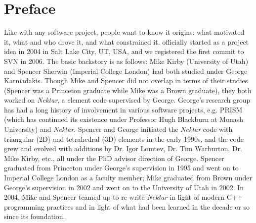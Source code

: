 \chapter{Preface}
 
Like with any software project, people want to know it origins:  what motivated it, what and who drove it, and what
constrained it.  \nek{} officially started as a project idea in 2004 in Salt Lake City, UT, USA, and we registered
the first commit to SVN in 2006.  The basic backstory is as follows:  Mike Kirby (University of Utah) and Spencer
Sherwin (Imperial College London) had both studied under George Karniadakis.  Though Mike and Spencer did
not overlap in terms of their studies (Spencer was a Princeton graduate while Mike was a Brown graduate), they
both worked on \emph{Nektar}, a \shp{} element code supervised by George.  George's research group has
had a long history of involvement in various software projects, e.g. PRISM (which has continued its existence
under Professor Hugh Blackburn at Monash University) and \emph{Nektar}.  
Spencer and George initiated the \emph{Nektar} code with triangular (2D) and
tetrahedral (3D) \shp{} elements in the early 1990s, and the code grew and evolved with additions
by Dr. Igor Lomtev,  Dr. Tim Warburton, Dr. Mike Kirby, etc., all under the PhD advisor direction of George.  Spencer
graduated from Princeton under George's supervision in 1995 and went on to Imperial College London 
as a faculty member; Mike graduated from Brown under George's supervision in 2002 and went on to the
University of Utah in 2002.  In 2004, Mike and Spencer teamed up to re-write \emph{Nektar} in light of modern
C++ programming practices and in light of what had been learned in the decade or so since its foundation.


